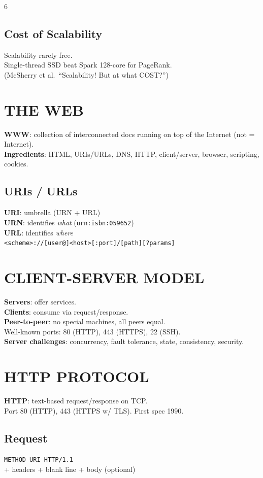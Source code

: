 \documentclass[10pt,landscape,letterpaper]{article}
\newcommand{\concept}[1]{\textcolor{conceptcyan}{\textbf{#1}}}
\newcommand{\process}[1]{\textcolor{processpurple}{\textbf{#1}}}
\newcommand{\important}[1]{\colorbox{highlightyellow}{#1}}
\begin{document}
\begin{multicols}{6}
\subsection{Cost of Scalability}
\important{Scalability rarely free.}\\
Single-thread SSD beat Spark 128-core for PageRank.\\
(McSherry et al.\ ``Scalability! But at what COST?'')

\section{THE WEB}
\concept{WWW}: collection of interconnected docs running on top of the Internet (not = Internet).\\
\concept{Ingredients}: HTML, URIs/URLs, DNS, HTTP, client/server, browser, scripting, cookies.

\subsection{URIs / URLs}
\concept{URI}: umbrella (URN + URL)\\
\concept{URN}: identifies \emph{what} (\texttt{urn:isbn:059652})\\
\concept{URL}: identifies \emph{where}\\
\important{\texttt{<scheme>://[user@]<host>[:port]/[path][?params]}}

\section{CLIENT-SERVER MODEL}
\concept{Servers}: offer services.\\
\concept{Clients}: consume via request/response.\\
\concept{Peer-to-peer}: no special machines, all peers equal.\\
Well-known ports: 80 (HTTP), 443 (HTTPS), 22 (SSH).\\
\process{Server challenges}: concurrency, fault tolerance, state, consistency, security.

\section{HTTP PROTOCOL}
\concept{HTTP}: text-based request/response on TCP.\\
Port 80 (HTTP), 443 (HTTPS w/ TLS). First spec 1990.

\subsection{Request}
\texttt{METHOD URI HTTP/1.1}\\
+ headers + blank line + body (optional)


\end{multicols}
\end{document}
